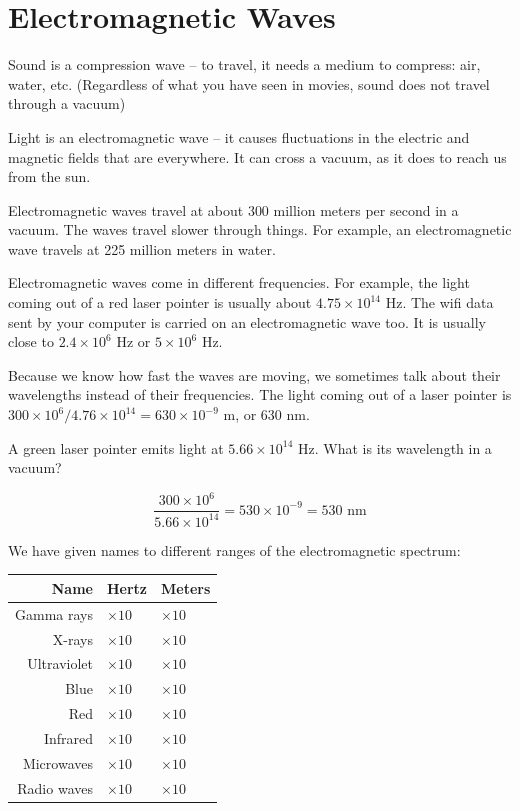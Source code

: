 \chapter{Electromagnetic Waves}

Sound is a compression wave -- to travel, it needs a medium to
compress: air, water, etc. (Regardless of what you have seen in
movies, sound does not travel through a vacuum)

Light is an electromagnetic wave -- it causes fluctuations in the
electric and magnetic fields that are everywhere. It can cross a
vacuum, as it does to reach us from the sun.

Electromagnetic waves travel at about 300 million meters per second in a
vacuum. The waves travel slower through things. For example, an
electromagnetic wave travels at 225 million meters in water.

Electromagnetic waves come in different frequencies. For example, the
light coming out of a red laser pointer is usually about $4.75 \times
10^{14}$ Hz.  The wifi data sent by your computer is carried on an
electromagnetic wave too. It is usually close to $2.4 \times 10^6$ Hz
or $5 \times 10^6$ Hz.

Because we know how fast the waves are moving, we sometimes talk about
their wavelengths instead of their frequencies.  The light coming out
of a laser pointer is $300 \times 10^6 / 4.76 \times 10^{14} = 630
\times 10^{-9}$ m, or 630 nm.

\begin{Exercise}[title={Wavelengths}, label=wave_length_green]

  A green laser pointer emits light at $5.66 \times
10^{14}$ Hz. What is its wavelength in a vacuum?
  
\end{Exercise}
\begin{Answer}[ref=wave_length_green]
$$\frac{300 \times 10^6}{5.66 \times 10^{14}} = 530 \times 10^{-9} = 530\text{ nm}$$
\end{Answer}

We have given names to different ranges of the electromagnetic spectrum:

\begin{tabular}{r | l | l}
  Name & Hertz & Meters \\
  \hline
Gamma rays  & $  \times 10^{}$ &$ \times 10^{}$\\
X-rays  & $ \times 10^{}$&$ \times 10^{}$\\
Ultraviolet  & $ \times 10^{}$&$ \times 10^{}$\\
Blue & $ \times 10^{}$&$ \times 10^{}$\\
Red  & $ \times 10^{}$&$ \times 10^{}$\\
Infrared  & $ \times 10^{}$&$ \times 10^{}$\\
Microwaves  & $ \times 10^{}$&$ \times 10^{}$\\
Radio waves  & $ \times 10^{}$&$ \times 10^{}$\\
\end{tabular}

